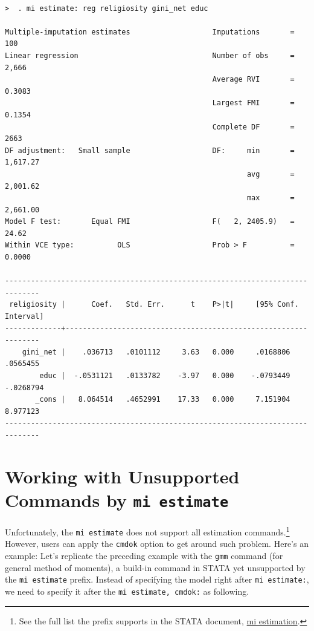 \documentclass[11pt,]{article}
\theoremstyle{definition}
\theoremstyle{definition}
\theoremstyle{remark}
\begin{document}
\begin{verbatim}

>  . mi estimate: reg religiosity gini_net educ

Multiple-imputation estimates                   Imputations       =        100
Linear regression                               Number of obs     =      2,666
                                                Average RVI       =     0.3083
                                                Largest FMI       =     0.1354
                                                Complete DF       =       2663
DF adjustment:   Small sample                   DF:     min       =   1,617.27
                                                        avg       =   2,001.62
                                                        max       =   2,661.00
Model F test:       Equal FMI                   F(   2, 2405.9)   =      24.62
Within VCE type:          OLS                   Prob > F          =     0.0000

------------------------------------------------------------------------------
 religiosity |      Coef.   Std. Err.      t    P>|t|     [95% Conf. Interval]
-------------+----------------------------------------------------------------
    gini_net |    .036713   .0101112     3.63   0.000     .0168806    .0565455
        educ |  -.0531121   .0133782    -3.97   0.000    -.0793449   -.0268794
       _cons |   8.064514   .4652991    17.33   0.000     7.151904    8.977123
------------------------------------------------------------------------------
\end{verbatim}

\section{\texorpdfstring{Working with Unsupported Commands by
\texttt{mi\ estimate}}{Working with Unsupported Commands by mi estimate}}\label{working-with-unsupported-commands-by-mi-estimate}

Unfortunately, the \texttt{mi\ estimate} does not support all estimation
commands.\footnote{See the full list the prefix supports in the STATA
  document,
  \href{http://www.stata.com/manuals14/miestimation.pdf\#miestimationDescriptionestimation_command}{mi
  estimation}.} However, users can apply the \texttt{cmdok} option to
get around such problem. Here's an example: Let's replicate the
preceding example with the \texttt{gmm} command (for general method of
moments), a build-in command in STATA yet unsupported by the
\texttt{mi\ estimate} prefix. Instead of specifying the model right
after \texttt{mi\ estimate:}, we need to specify it after the
\texttt{mi\ estimate,\ cmdok:} as following.
\end{document}
